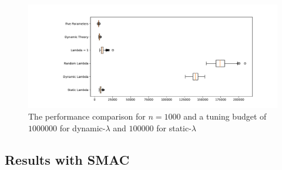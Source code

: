 \documentclass{article}
\newcommand{\smac}{\textsc{SMAC}\xspace}
\begin{document}
\begin{figure}[ht]
    \centering
        \includegraphics[width=1.0\textwidth]{box_plot_1000_100_1000.pdf}
        \caption{The performance comparison for $n = 1000$ and a tuning budget of $1000000$ for dynamic-$\lambda$ and $100000$ for static-$\lambda$}
        \label{box_plot_1000_100_1000}
\end{figure}

\subsection{Results with \smac}
\end{document}

